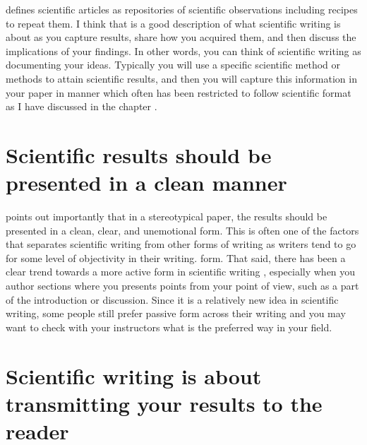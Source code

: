 \citet{katz2009research} defines scientific articles as repositories of scientific observations including recipes to repeat them.
I think that is a good description of what scientific writing is about as you capture results, share how you acquired them, and then discuss the implications of your findings.
In other words, you can think of scientific writing as documenting your ideas.
Typically you will use a specific scientific method or methods to attain scientific results, and then you will capture this information in your paper in manner which often has been restricted to follow scientific format as I have discussed in the chapter .

\section{Scientific results should be presented in a clean manner}

\citet{katz2009research} points out importantly that in a stereotypical paper, the results should be presented in a clean, clear, and unemotional form.
This is often one of the factors that separates scientific writing from other forms of writing as writers tend to go for some level of objectivity in their writing.
form.
That said, there has been a clear trend towards a more active form in scientific writing \citep{ryba2021better}, especially when you author sections where you presents points from your point of view, such as a part of the introduction or discussion.
Since it is a relatively new idea in scientific writing, some people still prefer passive form across their writing and you may want to check with your instructors what is the preferred way in your field.


\section{Scientific writing is about transmitting your results to the reader}

